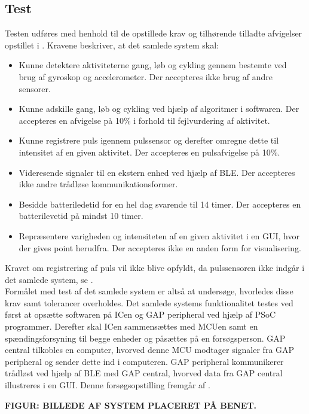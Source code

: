 \subsection{Test}
Testen udføres med henhold til de opstillede krav og tilhørende tilladte afvigelser opstillet i . Kravene beskriver, at det samlede system skal:
\begin{itemize}
	\item Kunne detektere aktiviteterne gang, løb og cykling gennem bestemte ved brug af gyroskop og accelerometer. Der accepteres ikke brug af andre sensorer.
	\item Kunne adskille gang, løb og cykling ved hjælp af algoritmer i softwaren. Der accepteres en afvigelse på 10\% i forhold til fejlvurdering af aktivitet.
	\item Kunne registrere puls igennem pulssensor og derefter omregne dette til intensitet af en given aktivitet. Der accepteres en pulsafvigelse på 10\%.
	\item Videresende signaler til en ekstern enhed ved hjælp af BLE. Der accepteres ikke andre trådløse kommunikationsformer.
	\item Besidde batteriledetid for en hel dag svarende til 14 timer. Der accepteres en batterilevetid på mindst 10 timer.
	\item Repræsentere varigheden og intensiteten af en given aktivitet i en GUI, hvor der gives point herudfra. Der accepteres ikke en anden form for visualisering. 
\end{itemize}
Kravet om registrering af puls vil ikke blive opfyldt, da pulssensoren ikke indgår i det samlede system, se . \\
Formålet med test af det samlede system er altså at undersøge, hvorledes disse krav samt tolerancer overholdes. Det samlede systems funktionalitet testes ved først at opsætte softwaren på ICen og GAP peripheral ved hjælp af PSoC programmer. Derefter skal ICen sammensættes med MCUen samt en spændingsforsyning til begge enheder og påsættes på en forsøgsperson. GAP central tilkobles en computer, hvorved denne MCU modtager signaler fra GAP peripheral og sender dette ind i computeren. GAP peripheral kommunikerer trådløst ved hjælp af BLE med GAP central, hvorved data fra GAP central illustreres i en GUI. Denne forsøgsopstilling fremgår af .

\textbf{FIGUR: BILLEDE AF SYSTEM PLACERET PÅ BENET.} \\

